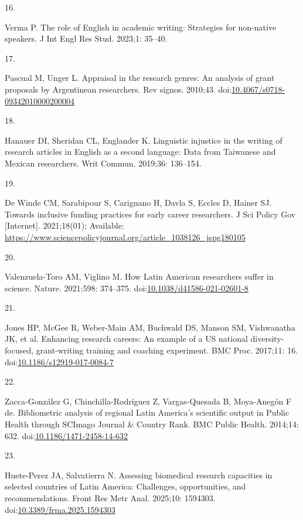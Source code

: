 \documentclass[
  letterpaper,
  DIV=11,
  numbers=noendperiod]{scrartcl}
\newlength{\cslhangindent}
\newlength{\csllabelwidth}
\newenvironment{CSLReferences}[2] %
 {\begin{list}{}{%
  \setlength{\itemindent}{0pt}
  \setlength{\leftmargin}{0pt}
  \setlength{\parsep}{0pt}
  \ifodd #1
   \setlength{\leftmargin}{\cslhangindent}
   \setlength{\itemindent}{-1\cslhangindent}
  \fi
  \setlength{\itemsep}{#2\baselineskip}}}
 {\end{list}}
\newcommand{\CSLLeftMargin}[1]{\parbox[t]{\csllabelwidth}{\strut#1\strut}}
\newcommand{\CSLRightInline}[1]{\parbox[t]{\linewidth - \csllabelwidth}{\strut#1\strut}}
\begin{document}
\begin{CSLReferences}{0}{1}
\CSLLeftMargin{16. }%
\CSLRightInline{Verma P. The role of {English} in academic writing:
Strategies for non-native speakers. J Int Engl Res Stud. 2023;1: 35--40.
}

\CSLLeftMargin{17. }%
\CSLRightInline{Pascual M, Unger L. Appraisal in the research genres: An
analysis of grant proposals by {Argentinean} researchers. Rev signos.
2010;43.
doi:\href{https://doi.org/10.4067/s0718-09342010000200004}{10.4067/s0718-09342010000200004}}

\CSLLeftMargin{18. }%
\CSLRightInline{Hanauer DI, Sheridan CL, Englander K. Linguistic
injustice in the writing of research articles in {English} as a second
language: Data from {Taiwanese} and {Mexican} researchers. Writ Commun.
2019;36: 136--154. }

\CSLLeftMargin{19. }%
\CSLRightInline{De Winde CM, Sarabipour S, Carignano H, Davla S, Eccles
D, Hainer SJ. Towards inclusive funding practices for early career
researchers. J Sci Policy Gov {[}Internet{]}. 2021;18(01); Available:
\url{https://www.sciencepolicyjournal.org/article_1038126_jspg180105}}

\CSLLeftMargin{20. }%
\CSLRightInline{Valenzuela-Toro AM, Viglino M. How {Latin American}
researchers suffer in science. Nature. 2021;598: 374--375.
doi:\href{https://doi.org/10.1038/d41586-021-02601-8}{10.1038/d41586-021-02601-8}}

\CSLLeftMargin{21. }%
\CSLRightInline{{Jones HP, McGee R, Weber-Main AM, Buchwald DS, Manson
SM, Vishwanatha JK, et al.} Enhancing research careers: An example of a
{US} national diversity-focused, grant-writing training and coaching
experiment. BMC Proc. 2017;11: 16.
doi:\href{https://doi.org/10.1186/s12919-017-0084-7}{10.1186/s12919-017-0084-7}}

\CSLLeftMargin{22. }%
\CSLRightInline{Zacca-González G, Chinchilla-Rodríguez Z, Vargas-Quesada
B, Moya-Anegón F de. Bibliometric analysis of regional {Latin America}'s
scientific output in {Public Health} through {SCImago Journal \& Country
Rank}. BMC Public Health. 2014;14: 632.
doi:\href{https://doi.org/10.1186/1471-2458-14-632}{10.1186/1471-2458-14-632}}

\CSLLeftMargin{23. }%
\CSLRightInline{Huete-Perez JA, Salvatierra N. Assessing biomedical
research capacities in selected countries of {Latin America}:
Challenges, opportunities, and recommendations. Front Res Metr Anal.
2025;10: 1594303.
doi:\href{https://doi.org/10.3389/frma.2025.1594303}{10.3389/frma.2025.1594303}}


\end{CSLReferences}
\end{document}
